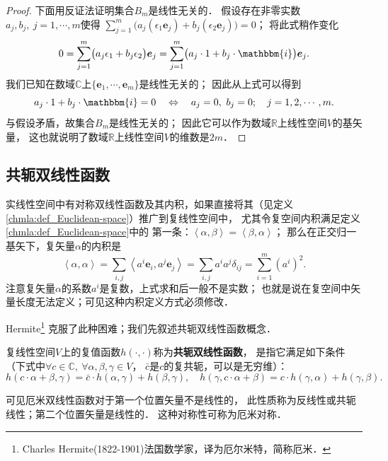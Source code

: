 \begin{proof}
下面用反证法证明集合$B_m$是线性无关的．
假设存在非零实数$a_{j},b_j,\ j=1,\cdots,m$使得
$\sum_{j=1}^{m}\bigl(a_j (\epsilon_1 \boldsymbol{e}_j )+ b_j (\epsilon_2 \boldsymbol{e}_j )\bigr)= 0$；
将此式稍作变化
\begin{equation}
    0=\sum_{j=1}^{m}\bigl(a_j \epsilon_1 + b_j \epsilon_2 \bigr) \boldsymbol{e}_j
     =\sum_{j=1}^{m}\bigl(a_j \cdot 1 + b_j \cdot \mathbbm{i}\bigr) \boldsymbol{e}_j .
\end{equation}
我们已知在数域$\mathbb{C}$上$\{\boldsymbol{e}_1,\cdots,\boldsymbol{e}_m\}$是线性无关的；
因此从上式可以得到
\begin{equation}
    a_j \cdot 1 + b_j \cdot \mathbbm{i}=0\quad \Leftrightarrow \quad
    a_j=0,\ b_j =0; \quad j=1,2,\cdots,m.
\end{equation}
与假设矛盾，故集合$B_m$是线性无关的；
因此它可以作为数域$\mathbb{R}$上线性空间$V$的基矢量，
这也就说明了数域$\mathbb{R}$上线性空间$V$的维数是$2m$．
\end{proof}



\subsection{共轭双线性函数}
实线性空间中有对称双线性函数及其内积，如果直接将其（见定义\ref{chmla:def_Euclidean-space}）推广到复线性空间中，
尤其令复空间内积满足定义\ref{chmla:def_Euclidean-space}中的
第一条：$\left<\alpha,\beta\right>=\left<\beta,\alpha\right>$；
那么在正交归一基矢下，复矢量$\alpha$的内积是
\begin{equation}
    \left<\alpha,\alpha\right> = \sum_{i,j}\left<a^i \boldsymbol{e}_i, a^j\boldsymbol{e}_j\right>
    =\sum_{i,j} a^i a^j \delta_{ij} = \sum_{i=1}^{m} (a^i)^2 .
\end{equation}
注意复矢量$\alpha$的系数$a^i$是复数，上式求和后一般不是实数；
也就是说在复空间中矢量长度无法定义；可见这种内积定义方式必须修改． 

Hermite{\footnote{Charles Hermite(1822-1901)法国数学家，译为厄尔米特，简称厄米．}}
克服了此种困难；我们先叙述共轭双线性函数概念．

\begin{definition}
    复线性空间$V$上的复值函数$h(\cdot,\cdot)$称为{\bfseries\heiti 共轭双线性函数}，
    是指它满足如下条件（下式中$\forall c\in \mathbb{C},\  \forall \alpha,\beta,\gamma\in V$，
    $\bar{c}$是$c$的复共轭，可以是无穷维）：
    \begin{equation*}
        h(c\cdot \alpha+\beta,\gamma) = \bar{c}\cdot h(\alpha,\gamma)+ h(\beta,\gamma),\quad
        h(\gamma,c\cdot \alpha+\beta) = c\cdot h(\gamma,\alpha)+ h(\gamma,\beta).
    \end{equation*}
\end{definition}
可见厄米{\kaishu 双线性}函数对于第一个位置矢量不是线性的，
此性质称为{\heiti 反线性}或{\heiti 共轭线性}；第二个位置矢量是线性的．
这种对称性可称为{\heiti 厄米对称}．


